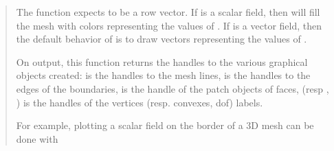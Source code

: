 \documentclass[a4paper,11pt,english]{sphinxmanual}
\begin{document}
\sphinxAtStartPar
{}
\begin{quote}

\sphinxAtStartPar
The function expects  to be a row vector. If  is a scalar
field, then  will fill the mesh with colors
representing the values of . If  is a vector field, then
the default behavior of  is to draw vectors representing
the values of .

\sphinxAtStartPar
On output, this function returns the handles to the various
graphical objects created:  is the handles to the mesh
lines,  is the handles to the edges of the boundaries, 
is the handle of the patch objects of faces,  (resp
, ) is the handles of the vertices (resp. convexes,
dof) labels.

\sphinxAtStartPar
For example, plotting a scalar field on the border of a 3D mesh can be done with

\begin{sphinxVerbatim}[commandchars=\\\{\}]
\PYGZsh{}
\end{sphinxVerbatim}
\end{quote}
\end{document}
